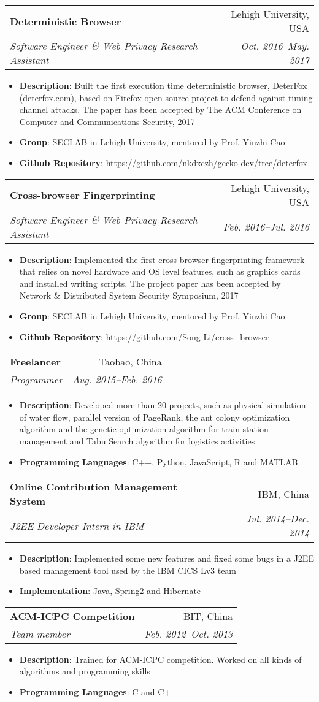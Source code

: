 \documentclass[letterpaper,11pt]{article}
\makeatletter
\newcommand{\resumeItem}[2]{
  \item\small{
    \textbf{#1}{: #2 \vspace{-2pt}}
  }
}
\newcommand{\resumeSubheading}[4]{
  \vspace{-1pt}\item
    \begin{tabular*}{0.97\textwidth}{l@{\extracolsep{\fill}}r}
      \textbf{#1} & #2 \\
      \textit{\small#3} & \textit{\small #4} \\
    \end{tabular*}\vspace{-5pt}
}
\newcommand{\resumeItemListStart}{\begin{itemize}}
\newcommand{\resumeItemListEnd}{\end{itemize}\vspace{-5pt}}
\makeatother
\begin{document}
    \resumeSubheading
    {Deterministic Browser}
    {Lehigh University, USA}
    {Software Engineer \& Web Privacy Research Assistant}
    {Oct. 2016--May. 2017}
    \resumeItemListStart
    \resumeItem{Description}
    {Built the first execution time deterministic browser, DeterFox (deterfox.com), based on Firefox open-source project to defend against timing channel attacks. The paper has been accepted by The ACM Conference on Computer and Communications Security, 2017}    
    \resumeItem{Group}
    {SECLAB in Lehigh University, mentored by Prof. Yinzhi Cao}
    \resumeItem{Github Repository}
    {\url{https://github.com/nkdxczh/gecko-dev/tree/deterfox}}
    \resumeItemListEnd

    \resumeSubheading
    {Cross-browser Fingerprinting}
    {Lehigh University, USA}
    {Software Engineer \& Web Privacy Research Assistant}
    {Feb. 2016--Jul. 2016}
    \resumeItemListStart
    \resumeItem{Description}
    {Implemented the first cross-browser fingerprinting framework that relies on novel hardware and OS level features, such as graphics cards and installed writing scripts. The project paper has been accepted by Network \& Distributed System Security Symposium, 2017}    
    \resumeItem{Group}
    {SECLAB in Lehigh University, mentored by Prof. Yinzhi Cao}
    \resumeItem{Github Repository}
    {\url{https://github.com/Song-Li/cross_browser}}
    \resumeItemListEnd

    \resumeSubheading
    {Freelancer}
    {Taobao, China}
    {Programmer}
    {Aug. 2015--Feb. 2016}
    \resumeItemListStart
    \resumeItem{Description}
    {Developed more than 20 projects, such as physical simulation of water flow, parallel version of PageRank, the ant colony optimization algorithm and the genetic optimization algorithm for train station management and Tabu Search algorithm for logistics activities}    
    \resumeItem{Programming Languages}
    {C++, Python, JavaScript, R and MATLAB}
    \resumeItemListEnd

    \resumeSubheading
    {Online Contribution Management System}
    {IBM, China}
    {J2EE Developer Intern in IBM}
    {Jul. 2014--Dec. 2014}
    \resumeItemListStart
    \resumeItem{Description}
    {Implemented some new features and fixed some bugs in a J2EE based management tool used by the IBM CICS Lv3 team}    
    \resumeItem{Implementation}
    {Java, Spring2 and Hibernate}
    \resumeItemListEnd

    \resumeSubheading
    {ACM-ICPC Competition}
    {BIT, China}
    {Team member}
    {Feb. 2012--Oct. 2013}
    \resumeItemListStart
    \resumeItem{Description}
    {Trained for ACM-ICPC competition. Worked on all kinds of algorithms and programming skills}    
    \resumeItem{Programming Languages}
    {C and C++}
    \resumeItemListEnd
\end{document}
